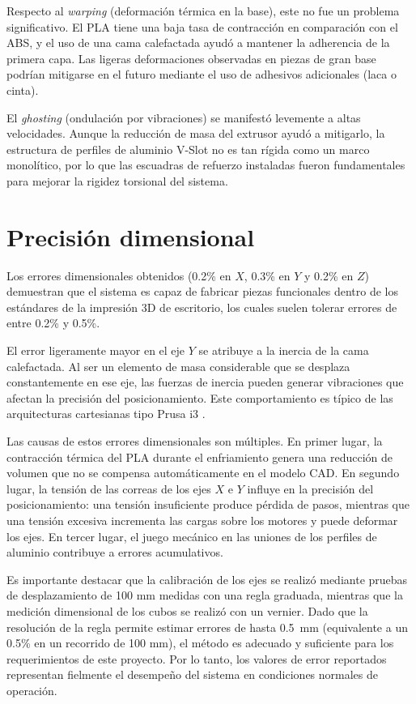 Respecto al \textit{warping} (deformación térmica en la base), este no fue un problema significativo. El PLA tiene una baja tasa de contracción en comparación con el ABS, y el uso de una cama calefactada ayudó a mantener la adherencia de la primera capa. Las ligeras deformaciones observadas en piezas de gran base podrían mitigarse en el futuro mediante el uso de adhesivos adicionales (laca o cinta).

El \textit{ghosting} (ondulación por vibraciones) se manifestó levemente a altas velocidades. Aunque la reducción de masa del extrusor ayudó a mitigarlo, la estructura de perfiles de aluminio V-Slot no es tan rígida como un marco monolítico, por lo que las escuadras de refuerzo instaladas fueron fundamentales para mejorar la rigidez torsional del sistema.

\section{Precisión dimensional}
\label{sec:discusion_precision}

Los errores dimensionales obtenidos (0.2\% en \(X\), 0.3\% en \(Y\) y 0.2\% en \(Z\)) demuestran que el sistema es capaz de fabricar piezas funcionales dentro de los estándares de la impresión 3D de escritorio, los cuales suelen tolerar errores de entre 0.2\% y 0.5\%\cite{gibson2021}.

El error ligeramente mayor en el eje \(Y\) se atribuye a la inercia de la cama calefactada. Al ser un elemento de masa considerable que se desplaza constantemente en ese eje, las fuerzas de inercia pueden generar vibraciones que afectan la precisión del posicionamiento. Este comportamiento es típico de las arquitecturas cartesianas tipo Prusa i3 \cite{cruzdeviana_efectos_2023}. 

Las causas de estos errores dimensionales son múltiples. En primer lugar, la contracción térmica del PLA durante el enfriamiento genera una reducción de volumen que no se compensa automáticamente en el modelo CAD. En segundo lugar, la tensión de las correas de los ejes \(X\) e \(Y\) influye en la precisión del posicionamiento: una tensión insuficiente produce pérdida de pasos, mientras que una tensión excesiva incrementa las cargas sobre los motores y puede deformar los ejes. En tercer lugar, el juego mecánico en las 
uniones de los perfiles de aluminio contribuye a errores acumulativos. 

Es importante destacar que la calibración de los ejes se realizó mediante pruebas de desplazamiento de 100 mm medidas con una regla graduada, mientras que la medición dimensional de los cubos se realizó con un vernier. Dado que la resolución de la regla permite estimar errores de hasta \qty{0.5}{\mm} (equivalente a un 0.5\% en un recorrido de 100 mm), el método es adecuado y suficiente para los requerimientos de este proyecto. Por lo tanto, los valores de error reportados representan fielmente el desempeño del sistema en condiciones normales de operación.


